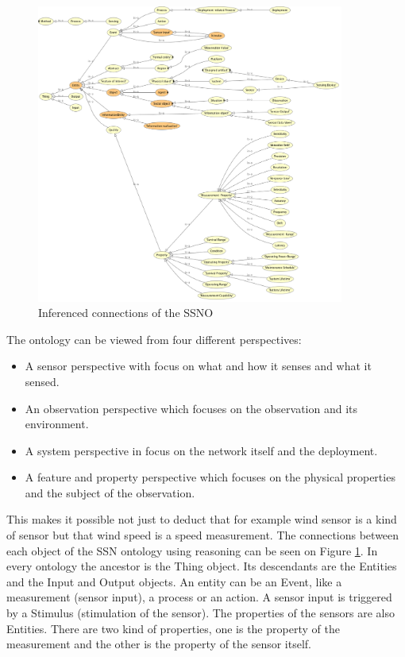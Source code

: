 \begin{figure}[h]
	\centering
	\includegraphics[width=0.9\textwidth]{figures/ssno-infer.png}
	\caption{Inferenced connections of the SSNO\label{fig:ssninfer}}
\end{figure}

The ontology can be viewed from four different perspectives:
\begin{itemize}
\item A sensor perspective with focus on what and how it senses and what it sensed.
\item An observation perspective which focuses on the observation and its environment.
\item A system perspective in focus on the network itself and the deployment.
\item A feature and property perspective which focuses on the physical properties and the subject of the observation. 
\end{itemize}
This makes it possible not just to deduct that for example wind sensor is a kind of sensor but that wind speed is a speed measurement. The connections between each object of the SSN ontology using reasoning can be seen on Figure \ref{fig:ssninfer}. 
In every ontology the ancestor is the Thing object. Its descendants are the Entities and the Input and Output objects. An entity can be an Event, like a measurement (sensor input), a process or an action. A sensor input is triggered by a Stimulus (stimulation of the sensor). The properties of the sensors are also Entities. There are two kind of properties, one is the property of the measurement and the other is the property of the sensor itself.

